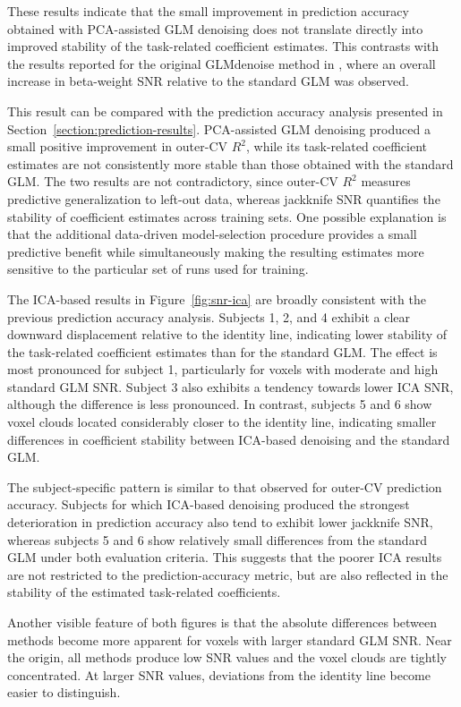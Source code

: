 \documentclass[english]{pwr_wmat_praca_dyplomowa}
\theoremstyle{definition}
\theoremstyle{remark}
\begin{document}
\newpage
These results indicate that the small improvement in prediction accuracy obtained with PCA-assisted GLM denoising does not translate directly into improved stability of the task-related coefficient estimates. This contrasts with the results reported for the original GLMdenoise method in \cite{glm-denoise}, where an overall increase in beta-weight SNR relative to the standard GLM was observed.

This result can be compared with the prediction accuracy analysis presented in Section~\ref{section:prediction-results}. PCA-assisted GLM denoising produced a small positive improvement in outer-CV $R^2$, while its task-related coefficient estimates are not consistently more stable than those obtained with the standard GLM. The two results are not contradictory, since outer-CV $R^2$ measures predictive generalization to left-out data, whereas jackknife SNR quantifies the stability of coefficient estimates across training sets. One possible explanation is that the additional data-driven model-selection procedure provides a small predictive benefit while simultaneously making the resulting estimates more sensitive to the particular set of runs used for training.

The ICA-based results in Figure~\ref{fig:snr-ica} are broadly consistent with the previous prediction accuracy analysis. Subjects 1, 2, and 4 exhibit a clear downward displacement relative to the identity line, indicating lower stability of the task-related coefficient estimates than for the standard GLM. The effect is most pronounced for subject 1, particularly for voxels with moderate and high standard GLM SNR. Subject 3 also exhibits a tendency towards lower ICA SNR, although the difference is less pronounced. In contrast, subjects 5 and 6 show voxel clouds located considerably closer to the identity line, indicating smaller differences in coefficient stability between ICA-based denoising and the standard GLM.

The subject-specific pattern is similar to that observed for outer-CV prediction accuracy. Subjects for which ICA-based denoising produced the strongest deterioration in prediction accuracy also tend to exhibit lower jackknife SNR, whereas subjects 5 and 6 show relatively small differences from the standard GLM under both evaluation criteria. This suggests that the poorer ICA results are not restricted to the prediction-accuracy metric, but are also reflected in the stability of the estimated task-related coefficients.

Another visible feature of both figures is that the absolute differences between methods become more apparent for voxels with larger standard GLM SNR. Near the origin, all methods produce low SNR values and the voxel clouds are tightly concentrated. At larger SNR values, deviations from the identity line become easier to distinguish.
\end{document}
